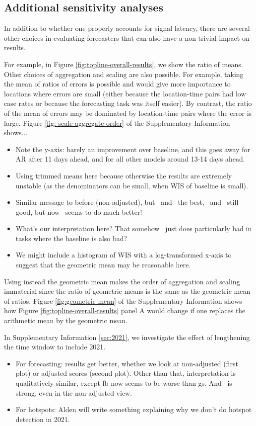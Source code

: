 \documentclass[9pt,twocolumn,twoside,lineno]{pnas-new}
\begin{document}
\subsection{Additional sensitivity analyses}

In addition to whether one properly accounts for signal latency, there
are several other choices in evaluating forecasters that can also have
a non-trivial impact on results.

For example, in Figure
\ref{fig:topline-overall-results}, we show the ratio
of means.  Other choices of aggregation and scaling are also
possible.  For example, taking the mean of ratios of errors is
possible and would give more importance to locations where
errors are small (either because the location-time pairs had low case
rates or because the forecasting task was itself easier).  By
contrast, the ratio of the mean of errors may be dominated by
location-time pairs where the error is large.
Figure \ref{fig:
  scale-aggregate-order} of the Supplementary Information shows...
\begin{itemize}
\item Note the y-axis: barely an improvement over baseline, and this goes away for AR after 11 days ahead, and for all other models around 13-14 days ahead.
\item Using trimmed means here because otherwise the results are extremely unstable (as the denominators can be small, when WIS of baseline is small).
\item Similar message to before (non-adjusted), but \dv~and \chngcov~the best, \fb~and \gs~still good, but now \chngcli~seems to do much better!  
\item What's our interpretation here?  That somehow \chngcli~just
  does particularly bad in tasks where the baseline is also bad?
  \item We might include a histogram of WIS with a log-transformed
    x-axis to suggest that the geometric mean may be reasonable here.
\end{itemize}
Using instead the geometric mean makes the order of aggregation and
scaling immaterial since the ratio of geometric means is the same as
the geometric mean of ratios.  Figure \ref{fig:geometric-mean} of the
Supplementary Information shows how Figure
\ref{fig:topline-overall-results} panel A would change if
one replaces the arithmetic mean by the geometric mean.

In Supplementary Information \ref{sec:2021}, we investigate the effect of lengthening
the time window to include 2021.
\begin{itemize}
\item For forecasting: results get better, whether we look at
  non-adjusted (first plot) or adjusted scores (second plot).  Other
  than that, interpretation is qualitatively similar, except fb now
  seems to be worse than gs.  And \chngcli~is strong, even in the
  non-adjusted view.
  \item For hotspots: Alden will write something explaining why we
    don't do hotspot detection in 2021.
\end{itemize}
\end{document}
